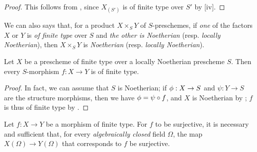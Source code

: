 \begin{proof}
\label{proof-1.6.3.8}
This follows from , since $X_{(S')}$ is of finite type over $S'$ by [iv].
\end{proof}

We can also says that, for a product $X\times_S Y$ of $S$-preschemes, if \emph{one} of the factors
$X$ or $Y$ is \emph{of finite type} over $S$ and \emph{the other is Noetherian} (resp. \emph{locally Noetherian}), then $X\times_S Y$ is \emph{Noetherian} (resp. \emph{locally Noetherian}).

\begin{cor}[6.3.9]
\label{1.6.3.9}
Let $X$ be a prescheme of finite type over a locally Noetherian prescheme $S$.
Then every $S$-morphism $f:X\to Y$ is of finite type.
\end{cor}

\begin{proof}
\label{proof-1.6.3.9}
In fact, we can assume that $S$ is Noetherian;
if $\phi:X\to S$ and $\psi:Y\to S$ are the structure morphisms, then we have $\phi=\psi\circ f$, and $X$ is Noetherian by ;
$f$ is thus of finite type by .
\end{proof}

\begin{prop}[6.3.10]
\label{1.6.3.10}
Let $f:X\to Y$ be a morphism of finite type.
For $f$ to be surjective, it is necessary and sufficient that, for every \emph{algebraically closed} field $\Omega$, the map $X(\Omega)\to Y(\Omega)$ that corresponds to $f$  be surjective.
\end{prop}

